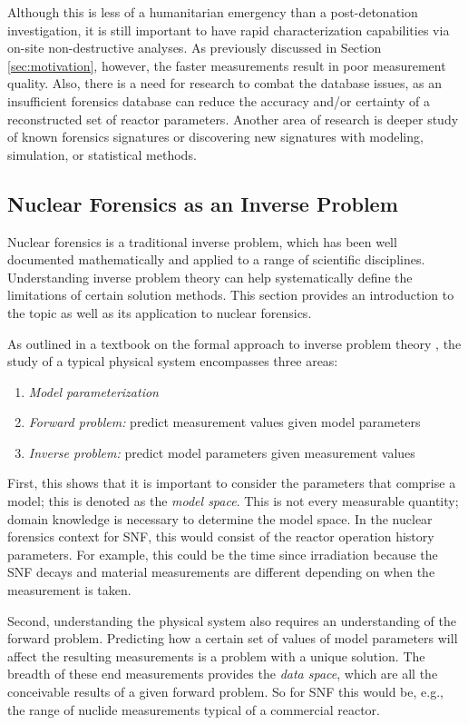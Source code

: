 Although this is less of a humanitarian emergency than a post-detonation
investigation, it is still important to have rapid characterization
capabilities via on-site non-destructive analyses.  As previously discussed in
Section \ref{sec:motivation}, however, the faster measurements result in poor
measurement quality. Also, there is a need for research to combat the database
issues, as an insufficient forensics database can reduce the accuracy and/or
certainty of a reconstructed set of reactor parameters.  Another area of
research is deeper study of known forensics signatures or discovering new
signatures with modeling, simulation, or statistical methods. 

\subsection{Nuclear Forensics as an Inverse Problem}
\label{sec:inverse}

Nuclear forensics is a traditional inverse problem, which has been well
documented mathematically and applied to a range of scientific disciplines.
Understanding inverse problem theory can help systematically define the
limitations of certain solution methods.  This section provides an introduction
to the topic as well as its application to nuclear forensics. 

As outlined in a textbook on the formal approach to inverse problem theory
\cite{inverse_theory}, the study of a typical physical system encompasses three
areas:
\begin{enumerate}
  \itemsep-0.75em
  \item \textit{Model parameterization}
  \item \textit{Forward problem:} predict measurement values given model parameters
  \item \textit{Inverse problem:} predict model parameters given measurement values
\end{enumerate}

First, this shows that it is important to consider the parameters that comprise
a model; this is denoted as the \textit{model space}. This is not every
measurable quantity; domain knowledge is necessary to determine the model
space. In the nuclear forensics context for \gls{SNF}, this would consist of
the reactor operation history parameters. For example, this could be the time
since irradiation because the \gls{SNF} decays and material measurements are
different depending on when the measurement is taken.

Second, understanding the physical system also requires an understanding of the
forward problem. Predicting how a certain set of values of model parameters
will affect the resulting measurements is a problem with a unique solution.
The breadth of these end measurements provides the \textit{data space}, which
are all the conceivable results of a given forward problem. So for \gls{SNF}
this would be, e.g., the range of nuclide measurements typical of a commercial
reactor. 

